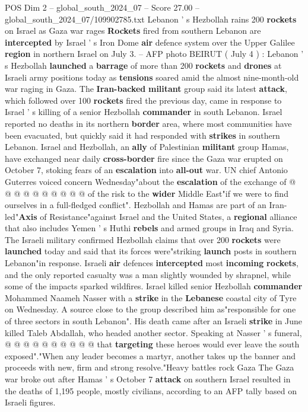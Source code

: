 \begin{textsample}{POS Dim 2 – global\_south\_2024\_07 – Score 27.00 – global\_south\_2024\_07/109902785.txt}  \label{ex:f2_pos_063}
Lebanon ' s Hezbollah rains 200 \textbf{rockets} on Israel as Gaza war rages \textbf{Rockets} fired from southern Lebanon are \textbf{intercepted} by Israel ' s Iron Dome \textbf{air} defence system over the Upper Galilee \textbf{region} in northern Israel on July 3. -- AFP photo BEIRUT ( July 4 ) : Lebanon ' s Hezbollah \textbf{launched} a \textbf{barrage} of more than 200 \textbf{rockets} and \textbf{drones} at Israeli army positions today as \textbf{tensions} soared amid the almost nine-month-old war raging in Gaza.
The \textbf{Iran-backed} \textbf{militant} group said its latest \textbf{attack}, which followed over 100 \textbf{rockets} fired the previous day, came in response to Israel ' s killing of a senior Hezbollah \textbf{commander} in south Lebanon.
Israel reported no deaths in its northern \textbf{border} area, where most communities have been evacuated, but quickly said it had responded with \textbf{strikes} in southern Lebanon.
Israel and Hezbollah, an \textbf{ally} of Palestinian \textbf{militant} group Hamas, have exchanged near daily \textbf{cross-border} fire since the Gaza war erupted on October 7, stoking fears of an \textbf{escalation} into \textbf{all-out} war.
UN chief Antonio Guterres voiced concern Wednesday"about the \textbf{escalation} of the exchange of @ @ @ @ @ @ @ @ @ @ of the risk to the \textbf{wider} Middle East"if we were to find ourselves in a full-fledged conflict".
Hezbollah and Hamas are part of an Iran-led"\textbf{Axis} of Resistance"against Israel and the United States, a \textbf{regional} alliance that also includes Yemen ' s Huthi \textbf{rebels} and armed groups in Iraq and Syria.
The Israeli military confirmed Hezbollah claims that over 200 \textbf{rockets} were \textbf{launched} today and said that its forces were"striking \textbf{launch} posts in southern Lebanon"in response.
Israeli \textbf{air} defences \textbf{intercepted} most \textbf{incoming} \textbf{rockets}, and the only reported casualty was a man slightly wounded by shrapnel, while some of the impacts sparked wildfires.
Israel killed senior Hezbollah \textbf{commander} Mohammed Naameh Nasser with a \textbf{strike} in the \textbf{Lebanese} coastal city of Tyre on Wednesday.
A source close to the group described him as"responsible for one of three sectors in south Lebanon".
His death came after an Israeli \textbf{strike} in June killed Taleb Abdallah, who headed another sector.
Speaking at Nasser ' s funeral, @ @ @ @ @ @ @ @ @ @ that \textbf{targeting} these heroes would ever leave the south exposed"."When any leader becomes a martyr, another takes up the banner and proceeds with new, firm and strong resolve."Heavy battles rock Gaza The Gaza war broke out after Hamas ' s October 7 \textbf{attack} on southern Israel resulted in the deaths of 1,195 people, mostly civilians, according to an AFP tally based on Israeli figures.

\end{textsample}
